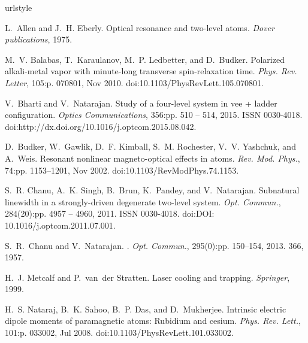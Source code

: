 {\begin{thebibliography}{99}
\providecommand{\url}[1]{\texttt{#1}}
\providecommand{\urlprefix}{URL }
\expandafter\ifx\csname urlstyle\endcsname\relax
  \providecommand{\doi}[1]{doi:\discretionary{}{}{}#1}\else
  \providecommand{\doi}{doi:\discretionary{}{}{}\begingroup
  \urlstyle{rm}\Url}\fi

L.~Allen and J.~H. Eberly.
\newblock Optical resonance and two-level atoms.
\newblock \emph{Dover publications}, 1975.

M.~V. Balabas, T.~Karaulanov, M.~P. Ledbetter, and D.~Budker.
\newblock Polarized alkali-metal vapor with minute-long transverse
  spin-relaxation time.
\newblock \emph{Phys. Rev. Letter}, 105:p. 070801, Nov 2010.
\newblock \doi{10.1103/PhysRevLett.105.070801}.

V.~Bharti and V.~Natarajan.
\newblock Study of a four-level system in vee + ladder configuration.
\newblock \emph{Optics Communications}, 356:pp. 510 -- 514, 2015.
\newblock ISSN 0030-4018.
\newblock \doi{http://dx.doi.org/10.1016/j.optcom.2015.08.042}.

D.~Budker, W.~Gawlik, D.~F. Kimball, S.~M. Rochester, V.~V. Yashchuk, and
  A.~Weis.
\newblock Resonant nonlinear magneto-optical effects in atoms.
\newblock \emph{Rev. Mod. Phys.}, 74:pp. 1153--1201, Nov 2002.
\newblock \doi{10.1103/RevModPhys.74.1153}.

S.~R. Chanu, A.~K. Singh, B.~Brun, K.~Pandey, and V.~Natarajan.
\newblock Subnatural linewidth in a strongly-driven degenerate two-level
  system.
\newblock \emph{Opt. Commun.}, 284(20):pp. 4957 -- 4960, 2011.
\newblock ISSN 0030-4018.
\newblock \doi{DOI: 10.1016/j.optcom.2011.07.001}.

S.~R.~Chanu and V.~Natarajan.
.
\newblock \emph{Opt. Commun.}, 295(0):pp. 150--154, 2013.
366, 1957.

H.~J. Metcalf and P.~van~der Stratten.
\newblock Laser cooling and trapping.
\newblock \emph{Springer}, 1999.

H.~S. Nataraj, B.~K. Sahoo, B.~P. Das, and D.~Mukherjee.
\newblock Intrinsic electric dipole moments of paramagnetic atoms: Rubidium and
  cesium.
\newblock \emph{Phys. Rev. Lett.}, 101:p. 033002, Jul 2008.
\newblock \doi{10.1103/PhysRevLett.101.033002}.


\end{thebibliography}}
